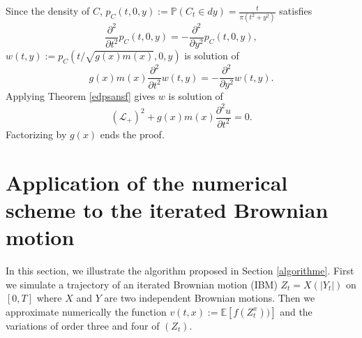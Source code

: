 \documentclass[a4paper, 11pt]{article}
\renewcommand{\P}{\mathbb{P}}
\newcommand{\E}{\mathbb{E}}
\newcommand{\1}{\mathbf{1}}
\begin{document}
\medskip

 Since the density of $C$, $p_C(t,0,y):=\P(C_t\in dy)=\frac{t}{\pi(t^2+y^2)}$ satisfies 
$$\frac{\partial^2}{\partial t^2}p_C(t,0,y)=-\frac{\partial^2}{\partial y^2}p_C(t,0,y),$$
$w(t,y):=p_C(t/\sqrt{g(x)m(x)},0,y)$ is solution of
$$g(x)m(x)\frac{\partial^2}{\partial t^2}w(t,y)=-\frac{\partial^2}{\partial y^2}w(t,y).$$
Applying Theorem \ref{edpsansf} gives $w$ is solution of
$$(\mathcal{L}_+)^2+g(x)m(x)\frac{\partial^2 u}{\partial t^2}=0.$$
Factorizing by $g(x)$ ends the proof. \hfill \framebox[0.6em]{}



\section{Application of the numerical scheme to the iterated Brownian motion}\label{application}

\noindent In this section, we illustrate the algorithm proposed in Section \ref{algorithme}. First we simulate a trajectory of an iterated Brownian motion (IBM) $Z_t=X(|Y_t|)$ on $[0,T]$ where $X$ and $Y$ are two independent Brownian motions. Then we approximate numerically the function $v(t,x):=\E \left[f(Z^x_t))\right]$  and the variations of order three and four of $(Z_t)$. 



\smallskip
\end{document}
